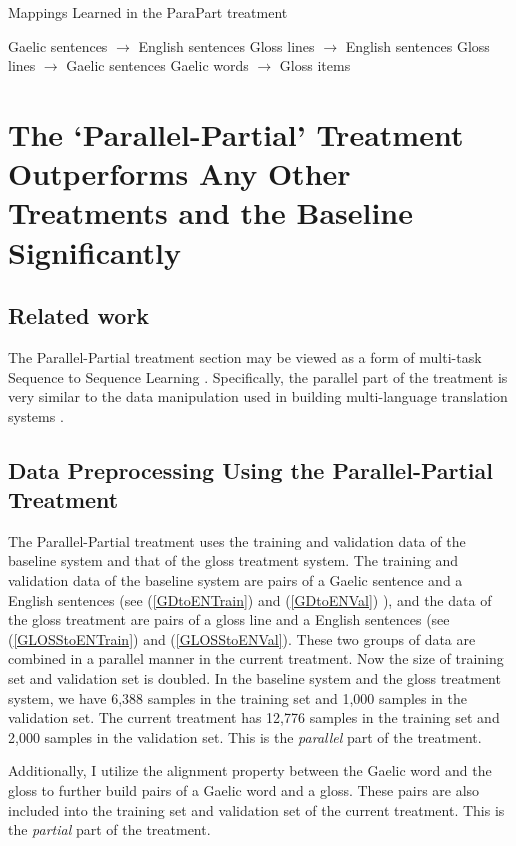 \documentclass[final]{ua-thesis}
\numberwithin{equation}{section}
\begin{document}
\begin{exe}
	\ex Mappings Learned in the ParaPart treatment
	\begin{xlist}
		\ex Gaelic sentences $\rightarrow$ English sentences
		\ex Gloss lines $\rightarrow$ English sentences
		\ex Gloss lines $\rightarrow$ Gaelic sentences
		\ex Gaelic words $\rightarrow$ Gloss items
	\end{xlist}	
\end{exe}    

\section{The `Parallel-Partial' Treatment Outperforms Any Other Treatments and the Baseline Significantly}

\subsection{Related work}
The Parallel-Partial treatment section may be viewed as a form of multi-task Sequence to Sequence Learning \citep{luong2015multi}. Specifically, the parallel part of the treatment is very similar to the data manipulation used in building multi-language translation systems \citep{google_zero_shot}.  

\subsection{Data Preprocessing Using the Parallel-Partial Treatment}
The Parallel-Partial treatment uses the training and validation data of the baseline system and that of the gloss treatment system.  
The training and validation data of the baseline system are pairs of a Gaelic sentence and a English sentences (see (\ref{GDtoENTrain}) and (\ref{GDtoENVal}) ), 
and the data of the gloss treatment are pairs of a gloss line and a English sentences (see (\ref{GLOSStoENTrain}) and (\ref{GLOSStoENVal}). 
These two groups of data are combined in a parallel manner in the current treatment. Now the size of training set and validation set is doubled. In the baseline system and the gloss treatment system, we have 6,388 samples in the training set and 1,000 samples in the validation set. The current treatment has 12,776 samples in the training set and 2,000 samples in the validation set. This is the \textit{parallel} part of the treatment. 

Additionally, I utilize the alignment property between the Gaelic word and the gloss to further build pairs of a Gaelic word and a gloss. These pairs are also included into the training set and validation set of the current treatment. This is the \textit{partial} part of the treatment.   
\end{document}
